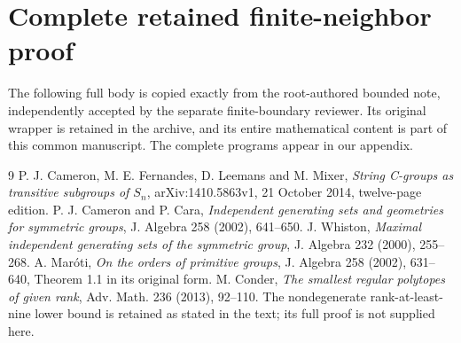 \documentclass[11pt]{article}
\begin{document}
\section{Complete retained finite-neighbor proof}
The following full body is copied exactly from the root-authored bounded note,
independently accepted by the separate finite-boundary reviewer. Its original
wrapper is retained in the archive, and its entire mathematical content is
part of this common manuscript. The complete programs appear in our appendix.

\begin{thebibliography}{9}
 P. J. Cameron, M. E. Fernandes, D. Leemans and M. Mixer,
\emph{String C-groups as transitive subgroups of $S_n$},
arXiv:1410.5863v1, 21 October 2014, twelve-page edition.
 P. J. Cameron and P. Cara, \emph{Independent generating
sets and geometries for symmetric groups}, J. Algebra 258 (2002), 641--650.
 J. Whiston, \emph{Maximal independent generating sets of
the symmetric group}, J. Algebra 232 (2000), 255--268.
 A. Mar\'oti, \emph{On the orders of primitive groups},
J. Algebra 258 (2002), 631--640, Theorem 1.1 in its original form.
 M. Conder, \emph{The smallest regular polytopes of given
rank}, Adv. Math. 236 (2013), 92--110. The nondegenerate rank-at-least-nine
lower bound is retained as stated in the text; its full proof is not supplied here.
\end{thebibliography}
\end{document}
